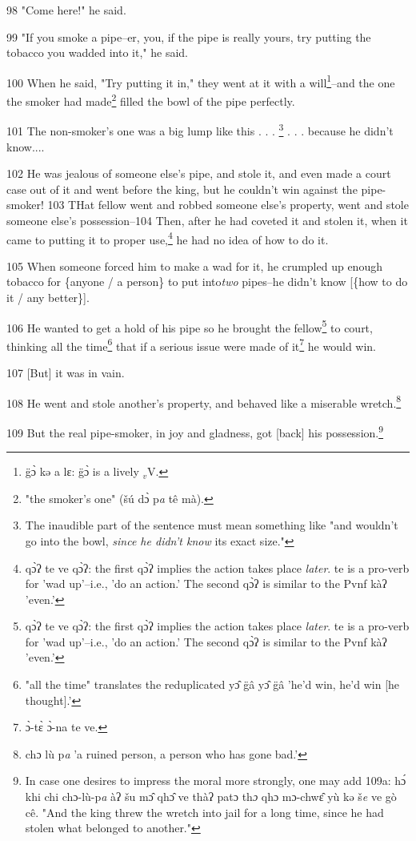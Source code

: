 98 "Come here!" he said.

99 "If you smoke a pipe--er, you, if the pipe is really yours, try putting
the tobacco you wadded into it," he said.

100 When he said, "Try putting it in," they went at it with a
will\footnote{g̈ɔ̀ kə a lɛ: g̈ɔ̀ is a lively $_{v}$V.}--and the one the smoker had made\footnote{"the smoker's one" (šú dɔ̀ p\emph{a} tê mà).} filled the bowl of the pipe perfectly.

101 The non-smoker's one was a big lump like this . . . \footnote{The inaudible part of the sentence must mean something like "and wouldn't go into the bowl, \textit{since he didn't know} its exact size."} . . . because he didn't
know....

102 He was jealous of someone else's pipe, and stole it, and even made a court
case out of it and went before the king, but he couldn't win against the pipe-smoker!
103 THat fellow went and robbed someone else's property, went and stole someone
else's possession--104 Then, after he had coveted it and stolen it, when it came
to putting it to proper use,\footnote{qɔ̀ʔ te ve qɔ̀ʔ: the first qɔ̀ʔ implies the action takes place \textit{later}. te is a pro-verb for 'wad up'--i.e., 'do an action.' The second qɔ̀ʔ is similar to the Pvnf kàʔ 'even.'} he had no idea of how to do it.

105 When someone forced him to make a wad for it, he crumpled up enough tobacco
for \{anyone / a person\} to put into\textit{two} pipes--he didn't know [\{how
to do it / any better\}].

106 He wanted to get a hold of his pipe so he brought the fellow\footnote{qɔ̀ʔ te ve qɔ̀ʔ: the first qɔ̀ʔ implies the action takes place \textit{later}. te is a pro-verb for 'wad up'--i.e., 'do an action.' The second qɔ̀ʔ is similar to the Pvnf kàʔ 'even.'} to court,
thinking all the time\footnote{"all the time" translates the reduplicated yɔ̂ g̈â yɔ̂ g̈â 'he'd win, he'd win [he thought].'} that if a serious issue were made of it\footnote{ɔ̀-tɛ̀ ɔ̀-na te ve.} he would
win.

107 [But] it was in vain.

108 He went and stole another's property, and behaved like a miserable wretch.\footnote{chɔ lù p\emph{a} 'a ruined person, a person who has gone bad.'}

109 But the real pipe-smoker, in joy and gladness, got [back] his possession.\footnote{In case one desires to impress the moral more strongly, one may add 109a: hɔ́ khi chi chɔ-lù-p\emph{a} àʔ šu mɔ̂ qhɔ̂ ve thàʔ patɔ th\emph{ɔ} qhɔ mɔ-chwɛ̂ yù kə š\emph{e} ve gò cê. "And the king threw the wretch into jail for a long time, since he had stolen what belonged to another."}

